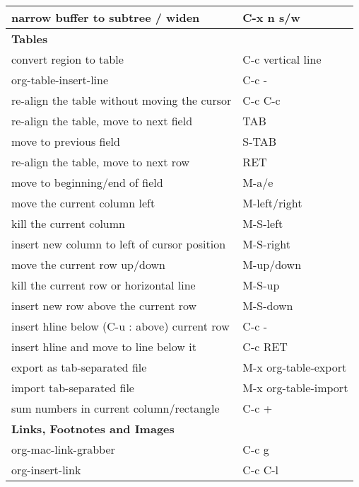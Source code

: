 \documentclass[english]{rcalibrionecolumn}
\begin{document}
\begin{longtable}{ll}
 narrow buffer to subtree / widen              &  C-x n s/w             \\
\hline
 \textbf{Tables}                               &                        \\
 convert region to table                       &  C-c vertical line     \\
 org-table-insert-line                         &  C-c -                 \\
 re-align the table without moving the cursor  &  C-c C-c               \\
 re-align the table, move to next field        &  TAB                   \\
 move to previous field                        &  S-TAB                 \\
 re-align the table, move to next row          &  RET                   \\
 move to beginning/end of field                &  M-a/e                 \\
 move the current column left                  &  M-left/right          \\
 kill the current column                       &  M-S-left              \\
 insert new column to left of cursor position  &  M-S-right             \\
 move the current row up/down                  &  M-up/down             \\
 kill the current row or horizontal line       &  M-S-up                \\
 insert new row above the current row          &  M-S-down              \\
 insert hline below (C-u : above) current row  &  C-c -                 \\
 insert hline and move to line below it        &  C-c RET               \\
 export as tab-separated file                  &  M-x org-table-export  \\
 import tab-separated file                     &  M-x org-table-import  \\
 sum numbers in current column/rectangle       &  C-c +                 \\
\hline
 \textbf{Links, Footnotes and Images}          &                        \\
 org-mac-link-grabber                          &  C-c g                 \\
 org-insert-link                               &  C-c C-l               \\

\end{longtable}
\end{document}
